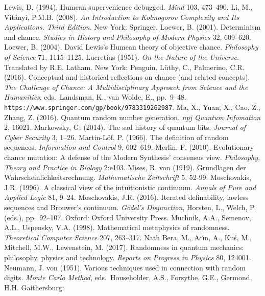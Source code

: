 \documentclass[11pt,a4paper]{article}
\numberwithin{equation}{section}
\begin{document}
\begin{small}
\begin{thebibliography}{99}
\bibitem{} Lewis, D. (1994). Humean supervenience debugged. \emph{Mind} 103, 473--490. 
    \bibitem{}   Li, M., Vit\'{a}nyi, P.M.B. (2008). \emph{An Introduction to Kolmogorov Complexity and Its Applications. Third Edition}.
    New York: Springer. 
     \bibitem{} Loewer, B. (2001). Determinism and chance.    \emph{Studies in History and Philosophy of Modern Physics} 32, 609--620.
  \bibitem{} Loewer, B. (2004). David Lewis's Humean theory of objective chance. \emph{Philosophy of Science} 71, 1115--1125.    
\bibitem{}  Lucretius (1951). \emph{On the Nature of the Universe}. Translated by R.E. Latham. New York: Penguin.     
\bibitem{}  L\"{u}thy, C., Palmerino, C.R. (2016). Conceptual and historical reflections on chance (and related concepts). 
 \emph{The Challenge of Chance: A Multidisciplinary Approach from Science and the Humanities}, eds.\  Landsman, K., van Wolde, E.,  pp.\ 9--48.  \verb#https://www.springer.com/gp/book/9783319262987#.
    \bibitem{} Ma, X., Yuan, X., Cao, Z., Zhang, Z. (2016).   Quantum random number generation. \emph{npj Quantum Infomation} 2, 16021.
        \bibitem{} Markowsky, G. (2014). The sad history of quantum bits. \emph{Journal of Cyber Security} 3, 1--26.
         \bibitem{} Martin-L\"{o}f, P. (1966). The definition of random sequences. \emph{Information and Control} 9, 602--619.        
        \bibitem{} Merlin, F. (2010). Evolutionary chance mutation: A defense of the Modern Synthesis' consensus view. 
        \emph{Philosophy, Theory and Practice in Biology} 2:e103.
        \bibitem{} Mises, R. von (1919).  {Grundlagen der Wahrscheinlichkeitsrechnung}.
        \emph{Mathematische Zeitschrift} 5, 52-99.
  \bibitem{}   Moschovakis, J.R. (1996). A classical view of the intuitionistic continuum. \emph{Annals of Pure and Applied Logic} 81, 9--24.
  \bibitem{}   Moschovakis, J.R. (2016).  Iterated definability, lawless sequences and Brouwer's continuum.
 \emph{G\"{o}del's Disjunction}, Horsten, L., Welch, P. (eds.), pp.\  92--107. Oxford: Oxford University Press. 
\bibitem{} Muchnik, A.A., Semenov, A.L.,  Uspensky, V.A. (1998). Mathematical metaphysics of randomness. 
\emph{Theoretical Computer Science} 207, 263--317. 
        \bibitem{}  Nath Bera, M., Ac\'{\i}n, A.,  Ku\'{s}, M., Mitchell, M.W.,   Lewenstein, M. (2017).  Randomness in quantum mechanics: philosophy, physics and technology.  \emph{Reports on Progress in Physics} 80, 124001.
          \bibitem{} Neumann, J. von (1951).   Various techniques used in connection with random digits.
\emph{Monte Carlo Method}, eds.\ Householder, A.S.,  Forsythe,  G.E., Germond, H.H.  Gaithersburg:

\end{thebibliography}
\end{small}
\end{document}

